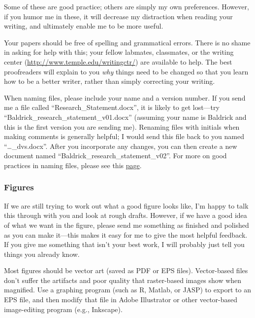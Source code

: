 \documentclass[letterpaper,12pt,oneside]{memoir}
\begin{document}
Some of these are good practice; others are simply my own preferences. However, if you humor me in these, it will decrease my distraction when reading your writing, and ultimately enable me to be more useful.

Your papers should be free of spelling and grammatical errors. There is no shame in asking for help with this; your fellow labmates, classmates, or the writing center (\url{http://www.temple.edu/writingctr/}) are available to help. The best proofreaders will explain to you \textit{why} things need to be changed so that you learn how to be a better writer, rather than simply correcting your writing. 


\begin{shaded}
\noindent When naming files, please include your name and a version number. If you send me a file called ``Research\_Statement.docx'', it is likely to get lost---try ``Baldrick\_research\_statement\_v01.docx'' (assuming your name is Baldrick and this is the first version you are sending me). Renaming files with initials when making comments is generally helpful; I would send this file back to you named ``\ldots\_dvs.docx''. After you incorporate any changes, you can then create a new document named ``Baldrick\_research\_statement\_v02''. For more on good practices in naming files, please see this \href{http://www2.stat.duke.edu/~rcs46/lectures_2015/01-markdown-git/slides/naming-slides/naming-slides.pdf}{page}.
\end{shaded}

\subsubsection{Figures}
If we are still trying to work out what a good figure looks like, I'm happy to talk this through with you and look at rough drafts. However, if we have a good idea of what we want in the figure, please send me something as finished and polished as you can make it---this makes it easy for me to give the most helpful feedback. If you give me something that isn't your best work, I will probably just tell you things you already know.

Most figures should be vector art (saved as PDF or EPS files). Vector-based files don't suffer the artifacts and poor quality that raster-based images show when magnified. Use a graphing program (such as R, Matlab, or JASP) to export to an EPS file, and then modify that file in Adobe Illustrator or other vector-based image-editing program (e.g., Inkscape).
\end{document}
